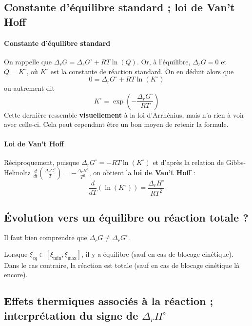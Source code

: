 \documentclass[french]{book}
\theoremstyle{plain}
\theoremstyle{definition}
\theoremstyle{remark}
\begin{document}
\subsection{Constante d'équilibre standard ; loi de Van't Hoff}
\paragraph{Constante d'équilibre standard}
On rappelle que $\Delta_rG=\Delta_rG^\circ+RT\ln(Q)$. Or, à l'équilibre, $\Delta_rG=0$ et $Q=K^\circ$, où $K^\circ$ est la constante de réaction standard. On en déduit alors que $$0=\Delta_rG^\circ+RT\ln(K^\circ)$$ ou autrement dit $$K^\circ=\exp\left(-\frac{\Delta_rG^\circ}{RT}\right)$$ Cette dernière ressemble \textbf{visuellement} à la loi d'Arrhénius, mais n'a rien à voir avec celle-ci. Cela peut cependant être un bon moyen de retenir la formule.
\paragraph{Loi de Van't Hoff} Réciproquement, puisque $\Delta_rG^\circ=-RT\ln(K^\circ)$ et d'après la relation de Gibbs-Helmoltz $\displaystyle\frac{d}{dt}\left(\frac{\Delta_rG^\circ}{T}\right)=-\frac{\Delta_rH^\circ}{T^2}$, on obtient la \textbf{loi de Van't Hoff} : $$\frac{d}{dT}\left(\ln(K^\circ)\right)=\frac{\Delta_rH^\circ}{RT^2}$$
\subsection{Évolution vers un équilibre ou réaction totale ?}
Il faut bien comprendre que $\Delta_rG\ne\Delta_rG^\circ$. \\ \par Lorsque $\xi_{eq}\in\left[\xi_\text{min},\xi_\text{max}\right]$, il y a équilibre (sauf en cas de blocage cinétique). Dans le cas contraire, la réaction est totale (sauf en cas de blocage cinétique là encore).
\subsection{Effets thermiques associés à la réaction ; interprétation du signe de $\Delta_rH^\circ$}
\end{document}
